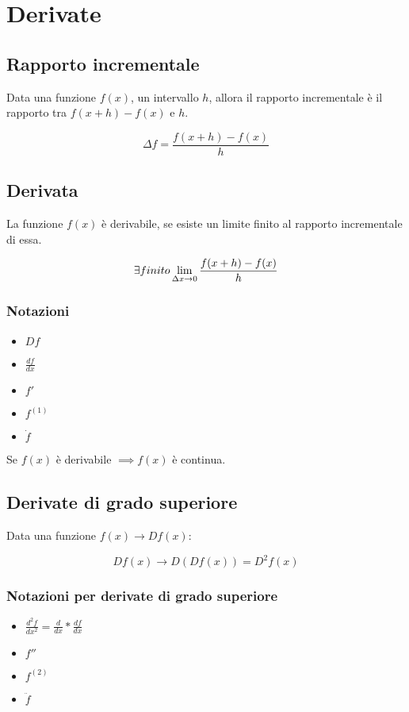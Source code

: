 \documentclass{subfiles}
\begin{document}
\section{Derivate}

\subsection{Rapporto incrementale}

Data una funzione $f(x)$, un intervallo $h$, allora il rapporto incrementale è il rapporto tra $f(x + h) - f(x)$ e $h$.

$$
\Delta f = \frac{f(x + h) - f(x)}{h}
$$

\subsection{Derivata}

La funzione $f(x)$ è derivabile, se esiste un limite finito al rapporto incrementale di essa.

$$
\exists \space finito \lim_{\Delta x \to 0} \frac{f(x + h) - f(x)}{h}
$$

\subsubsection{Notazioni}

\begin{itemize}
    \item $Df$
    \item $\frac{df}{dx}$
    \item $f'$
    \item $f^{(1)}$
    \item $\dot{f}$
\end{itemize}

Se $f(x)$ è derivabile $\implies f(x)$ è continua.

\subsection{Derivate di grado superiore}

Data una funzione $f(x) \to Df(x)$:

$$
Df(x) \to D(Df(x)) = D^2f(x)
$$

\subsubsection{Notazioni per derivate di grado superiore}

\begin{itemize}
    \item$\frac{d^2f}{dx^2} = \frac{d}{dx} * \frac{df}{dx}$
    \item $f''$
    \item $f^{(2)}$
    \item $\ddot{f}$
\end{itemize}
\end{document}
